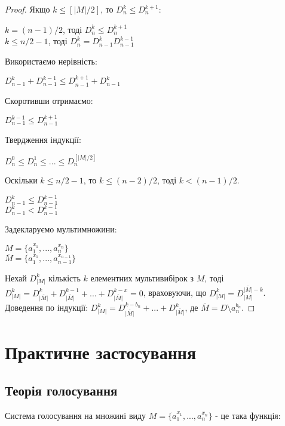 \begin{proof}
Якщо $k \leq [|M|/2]$, то $D_n^k \leq D_n^{k+1}$:
\begin{center}
$k = (n-1)/2$, тоді $D_n^k \leq D_n^{k+1}$
\\
$k \leq n/2 - 1$, тоді $D_n^k = D_{n-1}^k D_{n-1}^{k-1}$
\end{center}
Використаємо нерівність:
\begin{center}
$D_{n-1}^k + D_{n-1}^{k-1} \leq D_{n-1}^{k+1} + D_{n-1}^{k}$
\end{center}
Скоротивши отримаємо:
\begin{center}
$D_{n-1}^{k-1} \leq D_{n-1}^{k+1}$
\end{center}

Твердження індукції:
\begin{center}
$ D_n^0 \leq D_n^1 \leq ... \leq D_n^{[|M|/2]}$
\end{center}

Оскільки $k \leq n/2 - 1$, то $k \leq (n - 2)/2$, тоді $k < (n - 1)/2$.
\begin{center}
$D_{n-1}^{k} \leq D_{n-1}^{k-1}$
\\
$D_{n-1}^{k} < D_{n-1}^{k-1}$
\end{center}

Задекларуємо мультимножини:

\begin{center}
$M = \{a_1^{x_1}, ... , a_n^{x_n}\} $ 
\\
$\overline{M} = \{a_1^{x_1}, ... , a_{n-1}^{x_{n-1}}\} $ 
\end{center}

Нехай $D_{|M|}^k $ кількість $k$ елементних мультивибірок з $M$, тоді  $D_{|M|}^k =  D_{\overline{|M|}}^k + D_{\overline{|M|}}
^{k-1} + ... + D_{\overline{|M|}}^{k-x} = 0  $, враховуючи, що $D_{|M|}^k  = D_{|M|}^{\overline{|M|} - k}$. 
\\
Доведення по індукції: $D_{|M|}^k  = D_{\overline{|M|}}^{k-b_n} + ... + D_{\overline{|M|}}^k$, де $\overline{M} = D \setminus {a_n^{b_n}}$.






\end{proof}
\newpage

\chapter{Практичне застосування}

\section{Теорія голосування}
Система голосування на множині виду $M = \{a_1^{x_1}, ... , a_n^{x_n}\}$ - це така функція:

